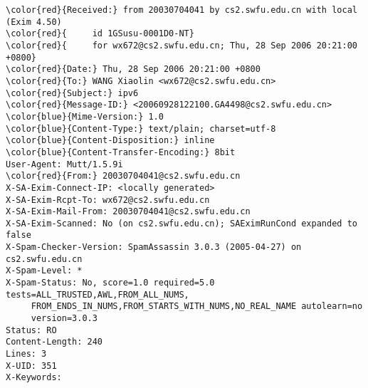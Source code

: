 \documentclass[varwidth=41em,crop]{standalone}
\begin{document}
\pagestyle{empty}

\begin{Verbatim}[commandchars=\\\{\}]
\color{red}{Received:} from 20030704041 by cs2.swfu.edu.cn with local (Exim 4.50)
\color{red}{     id 1GSusu-0001D0-NT}
\color{red}{     for wx672@cs2.swfu.edu.cn; Thu, 28 Sep 2006 20:21:00 +0800}
\color{red}{Date:} Thu, 28 Sep 2006 20:21:00 +0800
\color{red}{To:} WANG Xiaolin <wx672@cs2.swfu.edu.cn>
\color{red}{Subject:} ipv6
\color{red}{Message-ID:} <20060928122100.GA4498@cs2.swfu.edu.cn>
\color{blue}{Mime-Version:} 1.0
\color{blue}{Content-Type:} text/plain; charset=utf-8
\color{blue}{Content-Disposition:} inline
\color{blue}{Content-Transfer-Encoding:} 8bit
User-Agent: Mutt/1.5.9i
\color{red}{From:} 20030704041@cs2.swfu.edu.cn
X-SA-Exim-Connect-IP: <locally generated>
X-SA-Exim-Rcpt-To: wx672@cs2.swfu.edu.cn
X-SA-Exim-Mail-From: 20030704041@cs2.swfu.edu.cn
X-SA-Exim-Scanned: No (on cs2.swfu.edu.cn); SAEximRunCond expanded to false
X-Spam-Checker-Version: SpamAssassin 3.0.3 (2005-04-27) on cs2.swfu.edu.cn
X-Spam-Level: *
X-Spam-Status: No, score=1.0 required=5.0 tests=ALL_TRUSTED,AWL,FROM_ALL_NUMS,
     FROM_ENDS_IN_NUMS,FROM_STARTS_WITH_NUMS,NO_REAL_NAME autolearn=no
     version=3.0.3
Status: RO
Content-Length: 240
Lines: 3
X-UID: 351
X-Keywords: 
\end{Verbatim}
\end{document}
